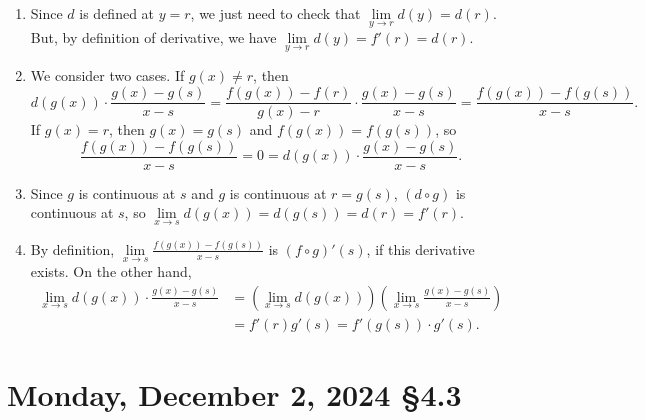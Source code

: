 \documentclass[12pt]{amsart}
\def\Mo{Monday}
\numberwithin{equation}{section}
\theoremstyle{plain} %
\newcommand{\Dec}[3]{\section{#2, December #1, 2024 \quad \S#3}}
\theoremstyle{definition}
\theoremstyle{remark}
\begin{document}
\begin{enumerate}
\begin{framed}
\begin{enumerate}
\item Since $d$ is defined at $y=r$, we just need to check that $\lim\limits_{y\to r}d(y) = d(r)$. But, by definition of derivative, we have $\lim\limits_{y\to r}d(y) = f'(r) = d(r)$.
\item We consider two cases. If $g(x)\neq r$, then 
\[ d(g(x)) \cdot \frac{g(x)-g(s)}{x-s} = \frac{f(g(x)) - f(r)}{g(x)-r} \cdot  \frac{g(x)-g(s)}{x-s} = \frac{f(g(x)) - f(g(s))}{x-s}.\]
If $g(x)=r$, then $g(x) = g(s)$ and $f(g(x))=f(g(s))$, so 
\[ \frac{f(g(x)) - f(g(s))}{x-s} = 0 = d(g(x)) \cdot \frac{g(x)-g(s)}{x-s}.\]
\item Since $g$ is continuous at $s$ and $g$ is continuous at $r=g(s)$, $(d\circ g)$ is continuous at $s$, so $\lim\limits_{x\to s} d(g(x)) =d(g(s)) = d(r)= f'(r)$.
\item By definition, 
$\lim\limits_{x\to s}  \frac{f(g(x)) - f(g(s))}{x-s} $ is $(f\circ g)'(s)$, if this derivative exists.
On the other hand, \[\begin{aligned}  \lim\limits_{x\to s} d(g(x)) \cdot \frac{g(x)-g(s)}{x-s} &= \left(\lim\limits_{x\to s} d(g(x))\right) \left(\lim\limits_{x\to s}  \frac{g(x)-g(s)}{x-s} \right) \\
&= f'(r) g'(s) = f'(g(s))\cdot g'(s).\end{aligned}\]
\end{enumerate}
\end{framed}

\end{enumerate}

\newpage

	\Dec{2}{\Mo}{4.3}	
\end{document}

